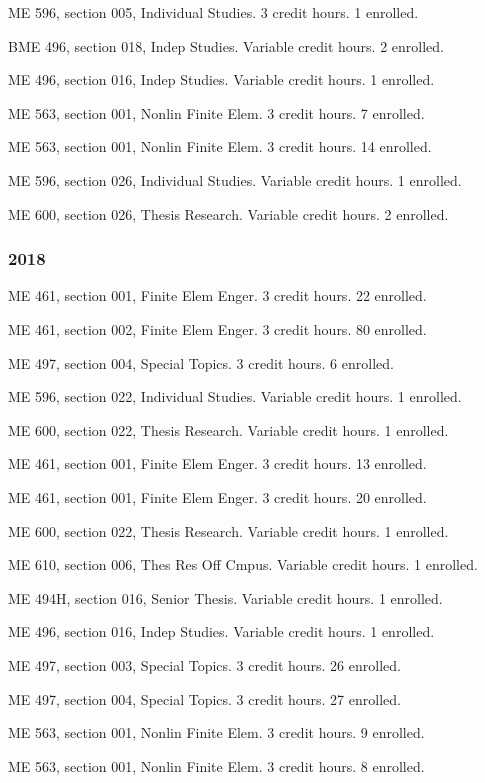 \documentclass[
]{article}
\begin{document}
ME 596, section 005, Individual Studies. 3 credit hours. 1 enrolled.

BME 496, section 018, Indep Studies. Variable credit hours. 2 enrolled.

ME 496, section 016, Indep Studies. Variable credit hours. 1 enrolled.

ME 563, section 001, Nonlin Finite Elem. 3 credit hours. 7 enrolled.

ME 563, section 001, Nonlin Finite Elem. 3 credit hours. 14 enrolled.

ME 596, section 026, Individual Studies. Variable credit hours. 1
enrolled.

ME 600, section 026, Thesis Research. Variable credit hours. 2 enrolled.

\subsubsection{2018}\label{section-6}

ME 461, section 001, Finite Elem Enger. 3 credit hours. 22 enrolled.

ME 461, section 002, Finite Elem Enger. 3 credit hours. 80 enrolled.

ME 497, section 004, Special Topics. 3 credit hours. 6 enrolled.

ME 596, section 022, Individual Studies. Variable credit hours. 1
enrolled.

ME 600, section 022, Thesis Research. Variable credit hours. 1 enrolled.

ME 461, section 001, Finite Elem Enger. 3 credit hours. 13 enrolled.

ME 461, section 001, Finite Elem Enger. 3 credit hours. 20 enrolled.

ME 600, section 022, Thesis Research. Variable credit hours. 1 enrolled.

ME 610, section 006, Thes Res Off Cmpus. Variable credit hours. 1
enrolled.

ME 494H, section 016, Senior Thesis. Variable credit hours. 1 enrolled.

ME 496, section 016, Indep Studies. Variable credit hours. 1 enrolled.

ME 497, section 003, Special Topics. 3 credit hours. 26 enrolled.

ME 497, section 004, Special Topics. 3 credit hours. 27 enrolled.

ME 563, section 001, Nonlin Finite Elem. 3 credit hours. 9 enrolled.

ME 563, section 001, Nonlin Finite Elem. 3 credit hours. 8 enrolled.
\end{document}
